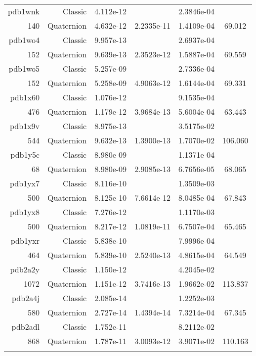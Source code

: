 \begin{xltabular}{\textwidth}{r|rS[table-format=1.3e+2]S[table-format=1.4e+2]S[table-format=1.4e+2]S[table-format=-1.3]}
pdb1wnk & Classic & 4.112e-12 &  & 2.3846e-04 & \\
140 & Quaternion & 4.632e-12 & 2.2335e-11 & 1.4109e-04 & 69.012\\  \addlinespace
pdb1wo4 & Classic & 9.957e-13 &  & 2.6937e-04 & \\
152 & Quaternion & 9.639e-13 & 2.3523e-12 & 1.5887e-04 & 69.559\\  \addlinespace
pdb1wo5 & Classic & 5.257e-09 &  & 2.7336e-04 & \\
152 & Quaternion & 5.258e-09 & 4.9063e-12 & 1.6144e-04 & 69.331\\  \addlinespace
pdb1x60 & Classic & 1.076e-12 &  & 9.1535e-04 & \\
476 & Quaternion & 1.179e-12 & 3.9684e-13 & 5.6004e-04 & 63.443\\  \addlinespace
pdb1x9v & Classic & 8.975e-13 &  & 3.5175e-02 & \\
544 & Quaternion & 9.632e-13 & 1.3900e-13 & 1.7070e-02 & 106.060\\  \addlinespace
pdb1y5c & Classic & 8.980e-09 &  & 1.1371e-04 & \\
68 & Quaternion & 8.980e-09 & 2.9085e-13 & 6.7656e-05 & 68.065\\  \addlinespace
pdb1yx7 & Classic & 8.116e-10 &  & 1.3509e-03 & \\
500 & Quaternion & 8.125e-10 & 7.6614e-12 & 8.0485e-04 & 67.843\\  \addlinespace
pdb1yx8 & Classic & 7.276e-12 &  & 1.1170e-03 & \\
500 & Quaternion & 8.217e-12 & 1.0819e-11 & 6.7507e-04 & 65.465\\  \addlinespace
pdb1yxr & Classic & 5.838e-10 &  & 7.9996e-04 & \\
464 & Quaternion & 5.839e-10 & 2.5240e-13 & 4.8615e-04 & 64.549\\  \addlinespace
pdb2a2y & Classic & 1.150e-12 &  & 4.2045e-02 & \\
1072 & Quaternion & 1.151e-12 & 3.7416e-13 & 1.9662e-02 & 113.837\\  \addlinespace
pdb2a4j & Classic & 2.085e-14 &  & 1.2252e-03 & \\
580 & Quaternion & 2.727e-14 & 1.4394e-14 & 7.3214e-04 & 67.345\\  \addlinespace
pdb2adl & Classic & 1.752e-11 &  & 8.2112e-02 & \\
868 & Quaternion & 1.787e-11 & 3.0093e-12 & 3.9071e-02 & 110.163\\  \addlinespace

\end{xltabular}
